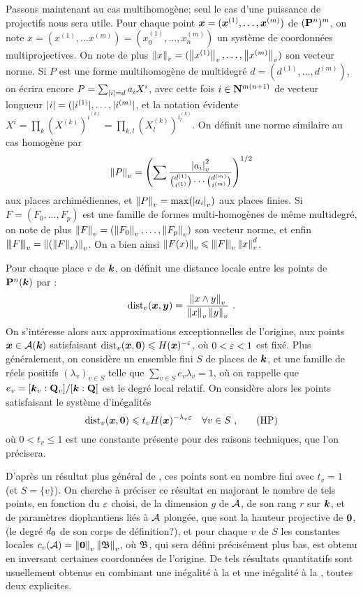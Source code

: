 Passons maintenant au cas multihomogène; seul le cas d'une puissance de projectifs nous sera utile. Pour chaque point ${\boldsymbol{x}} = ({\boldsymbol{x}}^{(1)}, \dots, {\boldsymbol{x}}^{(m)})$ de $(\mathbf{P}^n)^m$, on note $x = (x^{(1)}, \dots x^{(m)}) = (x_0^{(1)}, \dots, x_n^{(m)})$ un système de coordonnées multiprojectives. On note de plus $\left\lVert x\right\rVert_{v} = (\left\lVert x^{(1)}\right\rVert_{v},\dots, \left\lVert x^{(m)}\right\rVert_{v})$ son vecteur norme. Si $P$ est une forme multihomogène de multidegré $d= (d^{(1)}, \dots, d^{(m)})$, on écrira encore $P = \sum_{{|i|}=d} a_i X^i$, avec cette fois $i \in \mathbf{N}^{m(n+1)}$ de vecteur longueur ${|i|} = (|i^{(1)}|, \dots, |i^{(m)}|$, et la notation évidente $X^i = \prod_{k} (X^{(k)})^{i^{(k)}} = \prod_{k, l} (X_l^{(k)})^{i_l^{(k)}}$. On définit une norme similaire au cas homogène par 
\[\left\lVert P\right\rVert_{v} = \left( \sum \frac{ \left\lvert a_i\right\rvert_{v}^2}{\binom{d^{(1)}}{i^{(1)}} \cdots \binom{d^{(m)}}{i^{(m)}} } \right)^{1/2}  \] 
aux places archimédiennes, et $\left\lVert P\right\rVert_{v} = \max(\left\lvert a_i\right\rvert_{v})$ aux places finies. Si $F = (F_0, \dots, F_p)$ est une famille de formes multi-homogènes de même multidegré, on note de plus $\left\lVert F\right\rVert_{v} = (\left\lVert F_0\right\rVert_{v}, \dots, \left\lVert F_p\right\rVert_{v})$ son vecteur norme, et enfin $\left\lvert\hspace{-1pt}\left\lvert\hspace{-1pt}\left\lvert F\right\rvert\hspace{-1pt}\right\rvert\hspace{-1pt}\right\rvert_{v} = \left\lVert(\left\lVert F\right\rVert_{v})\right\rVert_{v}$. On a bien ainsi $\left\lVert F(x)\right\rVert_{v} \leqslant \left\lvert\hspace{-1pt}\left\lvert\hspace{-1pt}\left\lvert F\right\rvert\hspace{-1pt}\right\rvert\hspace{-1pt}\right\rvert_{v}\left\lVert x\right\rVert_{v}^d$.

Pour chaque place $v$ de $\boldsymbol{k}$, on définit une distance locale entre les points de $\mathbf{P}^n(\boldsymbol{k})$ par :
\[ \mathrm{dist}_v({\boldsymbol{x}}, {\boldsymbol{y}}) = \frac{\left\lVert x\wedge y \right\rVert_{v}}{\left\lVert x\right\rVert_{v}\left\lVert y\right\rVert_{v}}\text{ .} \]
On s'intéresse alors aux approximations exceptionnelles de l'origine,  aux points ${\boldsymbol{x}} \in \mathcal{A}(\boldsymbol{k})$ satisfaisant $\mathrm{dist}_v({\boldsymbol{x}}, {\boldsymbol{0}}) \leqslant H({\boldsymbol{x}})^{-\varepsilon}$, où $0<\varepsilon<1$ est fixé. Plus généralement, on considère un ensemble fini $S$ de places de $\boldsymbol{k}$, et une famille de réels positifs $(\lambda_v)_{v\in S}$ telle que $\sum_{v\in S} e_v \lambda_v = 1$, où on rappelle que $e_v = [\boldsymbol{k}_v : \mathbf{Q}_v]/[\boldsymbol{k} : \mathbf{Q}]$ est le degré local relatif. On considère alors les points satisfaisant le système d'inégalités \[\mathrm{dist}_v({\boldsymbol{x}}, {\boldsymbol{0}}) \leqslant t_v H({\boldsymbol{x}})^{-\lambda_v \varepsilon} \quad \forall v \in S \text{ ,} \tag{HP} \label{hyp} \] où $0<t_v\le 1$ est une constante présente pour des raisons techniques, que l'on précisera.

D'après un résultat plus général de , ces points sont en nombre fini avec $t_v = 1$ (et $S= \{v\}$). On cherche à préciser ce résultat en majorant le nombre de tels points, en fonction du $\varepsilon$ choisi, de la dimension $g$ de $\mathcal{A}$, de son rang $r$ sur $\boldsymbol{k}$, et de paramètres diophantiens liés à $\mathcal{A}$ plongée, que sont la hauteur projective de ${\boldsymbol{0}}$, (le degré $d_{\boldsymbol{0}}$ de son corps de définition?), et pour chaque $v$ de $S$ les constantes locales $c_v(\mathcal{A}) = \left\lVert{\boldsymbol{0}}\right\rVert_{v}\left\lVert\mathfrak{B}\right\rVert_{v}$, où $\mathfrak{B}$, qui sera défini précisément plus bas, est obtenu en inversant certaines coordonnées de l'origine. De tels résultats quantitatifs sont usuellement obtenus en combinant une inégalité à la  et une inégalité à la , toutes deux explicites.

